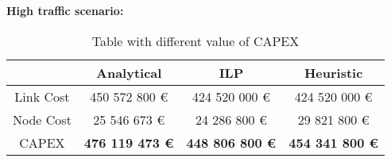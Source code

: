 \vspace{11pt}
\textbf{High traffic scenario:}\\

\begin{table}[h!]
\centering
\begin{tabular}{| c | c | c | c |}
 \hline
   & Analytical & ILP & Heuristic \\
 \hline\hline
 Link Cost & 450 572 800 \euro & 424 520 000 \euro & 424 520 000 \euro \\
 Node Cost & 25 546 673 \euro & 24 286 800 \euro & 29 821 800 \euro \\
 CAPEX & \textbf{476 119 473 \euro} & \textbf{448 806 800 \euro*} & \textbf{454 341 800 \euro} \\
 \hline
\end{tabular}
\caption{Table with different value of CAPEX }
\label{table_comparative_transp_protec_ref_3}
\end{table}


